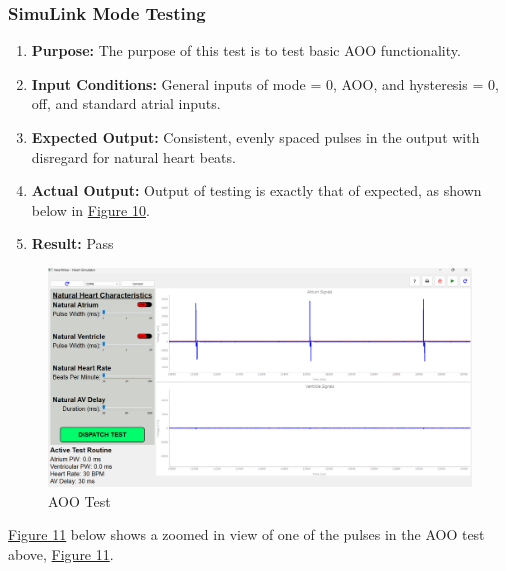 \documentclass{article}
\newcounter{subsubsubsection}[subsubsection]
\begin{document}
\subsubsection{SimuLink Mode Testing}


\begin{enumerate}[label=]
   \item \textbf{Purpose:} The purpose of this test is to test basic AOO functionality.
   \item \textbf{Input Conditions:} General inputs of mode = 0, AOO, and hysteresis = 0, off, and standard 
   atrial inputs. 
   \item \textbf{Expected Output:} Consistent, evenly spaced pulses in the output with disregard for natural heart beats.
   \item \textbf{Actual Output:} Output of testing is exactly that of expected, as shown below in \hyperref[AOOtest]{Figure 10}.
   \item \textbf{Result:} Pass
\end{enumerate}

\begin{tcolorbox}
    \begin{figure}[H]        
        \label{AOOtest}
        \includegraphics[width=\textwidth]{AOOtest1.png}
        \caption{AOO Test}
    \end{figure}
\end{tcolorbox}

\hyperref[AOOpulse]{Figure 11} below shows a zoomed in view of one of the pulses in the AOO test above, \hyperref[AOOtest]{Figure 11}. 
\end{document}
